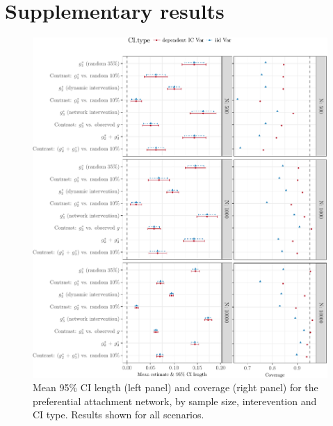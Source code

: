 \documentclass[english]{article}\usepackage[]{graphicx}\usepackage[]{color}
\makeatletter
\def\maxwidth{ %
  \ifdim\Gin@nat@width>\linewidth
    \linewidth
  \else
    \Gin@nat@width
  \fi
}
\newenvironment{knitrout}{}{} %
\theoremstyle{plain}
\theoremstyle{plain}
\makeatother
\begin{document}
\section{Supplementary results}
\begin{knitrout}\footnotesize
{}\color{fgcolor}\begin{figure}

{\centering \includegraphics[width=\maxwidth]{TablesFigs/knitR-CIres_ALL_prefattach-1} 

}

\caption[Mean 95\% CI length (left panel) and coverage (right panel) for the preferential attachment network, by sample size, interevention and CI type]{Mean 95\% CI length (left panel) and coverage (right panel) for the preferential attachment network, by sample size, interevention and CI type. Results shown for all scenarios.}\label{fig:CIres.ALL.prefattach}
\end{figure}


\end{knitrout}
\end{document}
